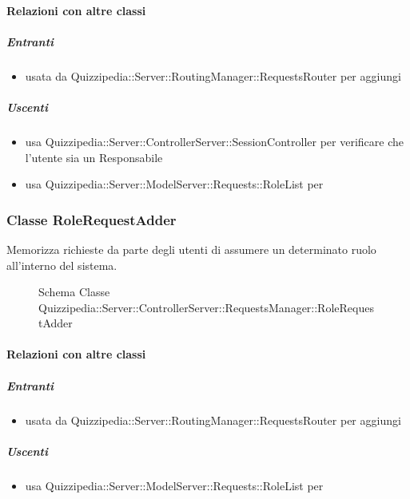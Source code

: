 \paragraph{Relazioni con altre classi}
\subparagraph{Entranti}
\begin{itemize}
\item usata da Quizzipedia::Server::RoutingManager::RequestsRouter per aggiungi
\end{itemize}
\subparagraph{Uscenti}
\begin{itemize}
\item usa Quizzipedia::Server::ControllerServer::SessionController per verificare che l'utente sia un Responsabile
\item usa Quizzipedia::Server::ModelServer::Requests::RoleList per 
\end{itemize}
\subsubsection{Classe RoleRequestAdder}
Memorizza richieste da parte degli utenti di assumere un determinato ruolo all'interno del sistema.
\begin{figure}[H]
\centering
\noindent{}
\caption[Schema Classe RoleRequestAdder]{Schema Classe Quizzipedia::Server::ControllerServer::RequestsManager::RoleRequestAdder}
\end{figure}
\paragraph{Relazioni con altre classi}
\subparagraph{Entranti}
\begin{itemize}
\item usata da Quizzipedia::Server::RoutingManager::RequestsRouter per aggiungi
\end{itemize}
\subparagraph{Uscenti}
\begin{itemize}
\item usa Quizzipedia::Server::ModelServer::Requests::RoleList per 
\end{itemize}

